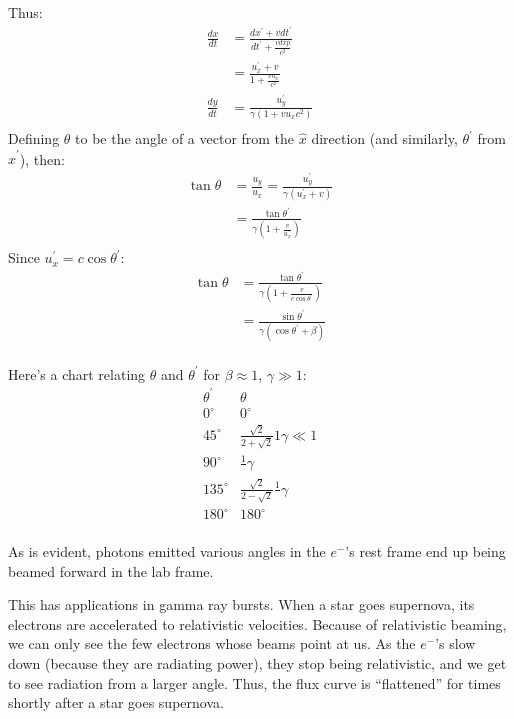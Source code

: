 \documentclass{article}
\def\inv#1{\frac1{#1}}
\def\inv#1{{\frac{1}{}#1}}
\def\xp{{x^{\prime}}}
\def\tp{{t^{\prime}}}
\def\upx{{u_x^\prime}}
\def\upy{{u_y^\prime}}
\def\^{\hat }
\begin{document}
Thus:
$$\begin{aligned}\frac{dx}{ dt}&=\frac{d\xp+vd\tp}{ d\tp+\frac{vdxp}{ c^2}}\\ 
&=\frac{\upx+v}{1+\frac{vu_x}{ c^2}}\\ 
\frac{dy}{ dt}&=\frac{\upy}{\gamma(1+{vu_x}{ c^2})}\\ \end{aligned}$$
Defining $\theta$ to be the angle of a vector from the $\^x$ direction (and
similarly, $\theta^\prime$ from $\^x^\prime$), then:
$$\begin{aligned}\tan\theta&=\frac{u_y}{ u_x}=\frac{\upy}{\gamma(\upx+v)}\\ 
&=\frac{\tan\theta^\prime}{\gamma(1+\frac{v}{\upx})}\\ \end{aligned}$$
Since $\upx=c\cos\theta^\prime$:
$$\begin{aligned}\tan\theta&=\frac{\tan\theta^\prime}{\gamma(1+\frac{v}{ 
c\cos\theta^\prime})}\\ 
&=\frac{\sin\theta^\prime}{\gamma(\cos\theta^\prime+\beta)}\\ \end{aligned}$$

Here's a chart relating $\theta$ and $\theta^\prime$ for $\beta\approx1$,
$\gamma\gg1$:
$$\begin{matrix}
\theta^\prime&\theta\\
0^\circ&0^\circ\\
45^\circ&\frac{\sqrt{2}}{2+\sqrt{2}}{1}{\gamma}\ll1\\
90^\circ&\inv{\gamma}\\
135^\circ&\frac{\sqrt{2}}{2-\sqrt{2}}\inv{\gamma}\\
180^\circ&180^\circ\\
\end{matrix}$$

As is evident, photons emitted various angles in the $e^-$'s rest frame
end up being beamed forward in the lab frame.

This has applications in gamma ray bursts.  When a star goes supernova, 
its electrons are accelerated to relativistic velocities.  Because of
relativistic beaming, we can only see the few electrons whose beams
point at us.  As the $e^-$'s slow down (because they are radiating power),
they stop being relativistic, and we get to see radiation from a larger
angle.  Thus, the flux curve is ``flattened'' for times shortly after
a star goes supernova.
\end{document}
